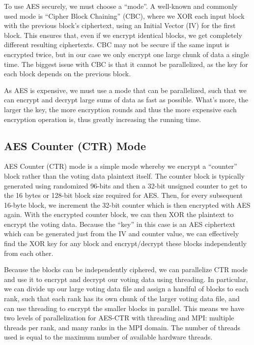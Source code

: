 \documentclass[final,5p,times,twocolumn,authoryear, 10pt]{elsarticle}
\begin{document}
To use AES securely, we must choose a ``mode''. A well-known and commonly used
mode is ``Cipher Block Chaining'' (CBC), where we XOR each input block with the
previous block's ciphertext, using an Initial Vector (IV) for the first block.
This ensures that, even if we encrypt identical blocks, we get completely
different resulting ciphertexts. CBC may not be secure if the same input is
encrypted twice, but in our case we only encrypt one large chunk of data a
single time. The biggest issue with CBC is that it cannot be parallelized, as
the key for each block depends on the previous block.

As AES is expensive, we must use a mode that can be parallelized, such that we
can encrypt and decrypt large sums of data as fast as possible. What's more,
the larger the key, the more encryption rounds and thus the more expensive each
encryption operation is, thus greatly increasing the running time.

\subsection{AES Counter (CTR) Mode}

AES Counter (CTR) mode is a simple mode whereby we encrypt a ``counter'' block
rather than the voting data plaintext itself. The counter block is typically
generated using randomized 96-bits and then a 32-bit unsigned counter to get to
the 16 bytes or 128-bit block size required for AES. Then, for every subsequent
16-byte block, we increment the 32-bit counter which is then encrypted with AES
again. With the encrypted counter block, we can then XOR the plaintext to
encrypt the voting data. Because the ``key'' in this case is an AES ciphertext
which can be generated just from the IV and counter value, we can effectively
find the XOR key for any block and encrypt/decrypt these blocks independently
from each other.

Because the blocks can be independently ciphered, we can parallelize CTR mode
and use it to encrypt and decrypt our voting data using threading. In
particular, we can divide up our large voting data file and assign a handful of
blocks to each rank, such that each rank has its own chunk of the larger voting
data file, and can use threading to encrypt the smaller blocks in parallel. This
means we have two levels of parallelization for AES-CTR with threading and MPI:
multiple threads per rank, and many ranks in the MPI domain. The number of
threads used is equal to the maximum number of available hardware threads.
\end{document}
